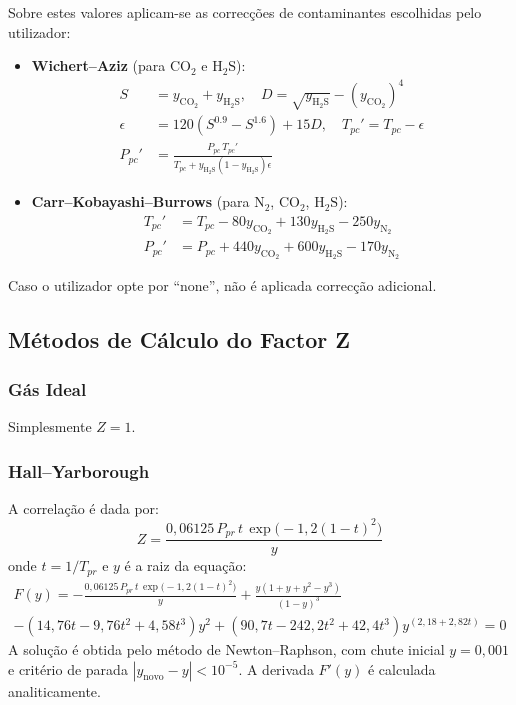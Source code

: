 \documentclass[a4paper,12pt]{article}
\begin{document}
Sobre estes valores aplicam-se as correcções de contaminantes escolhidas pelo utilizador:
\begin{itemize}
    \item \textbf{Wichert–Aziz} (para \(\mathrm{CO}_2\) e \(\mathrm{H}_2\mathrm{S}\)):
    \begin{align}
        S &= y_{\mathrm{CO}_2}+y_{\mathrm{H}_2\mathrm{S}},\quad D = \sqrt{y_{\mathrm{H}_2\mathrm{S}}} - (y_{\mathrm{CO}_2})^4 \\
        \epsilon &= 120(S^{0.9}-S^{1.6}) + 15D,\quad T_{pc}' = T_{pc}-\epsilon \\
        P_{pc}' &= \frac{P_{pc}\,T_{pc}'}{T_{pc}+y_{\mathrm{H}_2\mathrm{S}}(1-y_{\mathrm{H}_2\mathrm{S}})\epsilon}
    \end{align}
    \item \textbf{Carr–Kobayashi–Burrows} (para \(\mathrm{N}_2\), \(\mathrm{CO}_2\), \(\mathrm{H}_2\mathrm{S}\)):
    \begin{align}
        T_{pc}' &= T_{pc} -80y_{\mathrm{CO}_2}+130y_{\mathrm{H}_2\mathrm{S}}-250y_{\mathrm{N}_2} \\
        P_{pc}' &= P_{pc} +440y_{\mathrm{CO}_2}+600y_{\mathrm{H}_2\mathrm{S}}-170y_{\mathrm{N}_2}
    \end{align}
\end{itemize}
Caso o utilizador opte por “none”, não é aplicada correcção adicional.

\subsection{Métodos de Cálculo do Factor Z}
\subsubsection{Gás Ideal}
Simplesmente \(Z=1\).

\subsubsection{Hall–Yarborough}
A correlação é dada por:
\begin{equation}
    Z = \frac{0{,}06125\,P_{pr}\,t\,\exp\!\bigl(-1{,}2(1-t)^2\bigr)}{y}
\end{equation}
onde \(t = 1/T_{pr}\) e \(y\) é a raiz da equação:
\begin{multline}
    F(y) = -\frac{0{,}06125\,P_{pr}\,t\,\exp\!\bigl(-1{,}2(1-t)^2\bigr)}{y} + \frac{y(1+y+y^2-y^3)}{(1-y)^3} \\
    - (14{,}76t-9{,}76t^2+4{,}58t^3)y^2 + (90{,}7t-242{,}2t^2+42{,}4t^3)y^{(2{,}18+2{,}82t)} = 0
\end{multline}
A solução é obtida pelo método de Newton–Raphson, com chute inicial \(y=0{,}001\) e critério de parada \(|y_{\text{novo}}-y|<10^{-5}\). A derivada \(F'(y)\) é calculada analiticamente.
\end{document}
